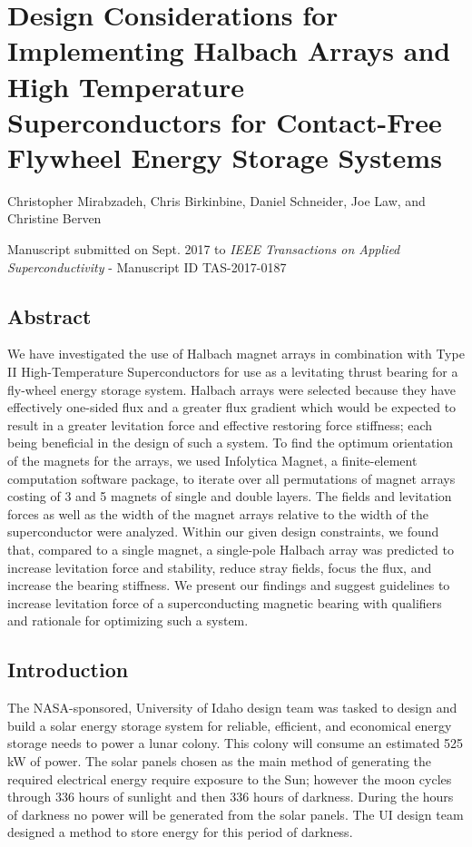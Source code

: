 \chapter{Design Considerations for Implementing Halbach Arrays and High Temperature Superconductors for Contact-Free Flywheel Energy Storage Systems}
Christopher Mirabzadeh, Chris Birkinbine, Daniel Schneider, Joe Law, and Christine Berven

\begin{center}
Manuscript submitted on Sept. 2017 to \textit{IEEE Transactions on Applied Superconductivity} - Manuscript ID TAS-2017-0187
\end{center}

\section*{Abstract}
We have investigated the use of Halbach magnet arrays in combination with Type II High-Temperature Superconductors for use as a levitating thrust bearing for a fly-wheel energy storage system. Halbach arrays were selected because they have effectively one-sided flux and a greater flux gradient which would be expected to result in a greater levitation force and effective restoring force stiffness; each being beneficial in the design of such a system. To find the optimum orientation of the magnets for the arrays, we used Infolytica Magnet, a finite-element computation software package, to iterate over all permutations of magnet arrays costing of 3 and 5 magnets of single and double layers. The fields and levitation forces as well as the width of the magnet arrays relative to the width of the superconductor were analyzed.  Within our given design constraints, we found that, compared to a single magnet, a single-pole Halbach array was predicted to increase levitation force and stability, reduce stray fields, focus the flux, and increase the bearing stiffness.  We present our findings and suggest guidelines to increase levitation force of a superconducting magnetic bearing with qualifiers and rationale for optimizing such a system.  

\section{Introduction}
The NASA-sponsored, University of Idaho design team was tasked to design and build a solar energy storage system for reliable, efficient, and economical energy storage needs to power a lunar colony. This colony will consume an estimated 525 kW of power. The solar panels chosen as the main method of generating the required electrical energy require exposure to the Sun; however the moon cycles through 336 hours of sunlight and then 336 hours of darkness. During the hours of darkness no power will be generated from the solar panels. The UI design team designed a method to store energy for this period of darkness. 

